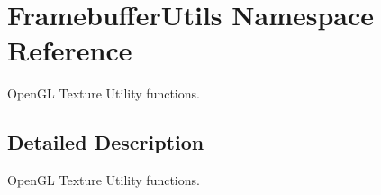 \hypertarget{namespace_framebuffer_utils}{}\section{Framebuffer\+Utils Namespace Reference}
\label{namespace_framebuffer_utils}


Open\+GL Texture Utility functions.  




\subsection{Detailed Description}
Open\+GL Texture Utility functions. 